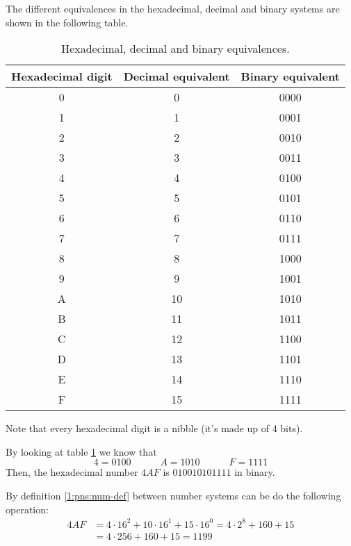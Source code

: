 The different equivalences in the hexadecimal, decimal and binary systems are shown in the following table.
\bgroup
\def\arraystretch{1.2}
\begin{table}[h!]
\centering
\begin{tabular}{ |c|c|c| }
    \hline
    \textbf{Hexadecimal digit} & \textbf{Decimal equivalent} & \textbf{Binary equivalent} \\
    \hline
    0 & 0 & 0000 \\
    \hline
    1 & 1 & 0001 \\
    \hline
    2 & 2 & 0010 \\
    \hline
    3 & 3 & 0011 \\
    \hline
    4 & 4 & 0100 \\
    \hline
    5 & 5 & 0101 \\
    \hline
    6 & 6 & 0110 \\
    \hline
    7 & 7 & 0111 \\
    \hline
    8 & 8 & 1000 \\
    \hline
    9 & 9 & 1001 \\
    \hline
    A & 10 & 1010 \\
    \hline
    B & 11 & 1011 \\
    \hline
    C & 12 & 1100 \\
    \hline
    D & 13 & 1101 \\
    \hline
    E & 14 & 1110 \\
    \hline
    F & 15 & 1111 \\
    \hline
\end{tabular}
\caption{Hexadecimal, decimal and binary equivalences.}
\label{tbl:hexadecimal-system}
\end{table}
\egroup

\begin{remark}
Note that every hexadecimal digit is a nibble (it's made up of 4 bits).
\end{remark}

\begin{example}
    By looking at table \ref{tbl:hexadecimal-system} we know that
    \begin{equation*}
        4 = 0100 \quad\quad\quad A = 1010 \quad\quad\quad F = 1111
    \end{equation*}
    Then, the hexadecimal number $4AF$ is $010010101111$ in binary.
\end{example}
\begin{example}
    By definition \ref{1:pns:num-def} between number systems can be do the following operation:
    \begin{align*}
        4AF &= 4\cdot 16^2  + 10\cdot 16^1 + 15\cdot 16^0 =  4\cdot 2^8 + 160 + 15 \\
            &= 4\cdot 256 + 160 + 15 = 1199
    \end{align*}
\end{example}

